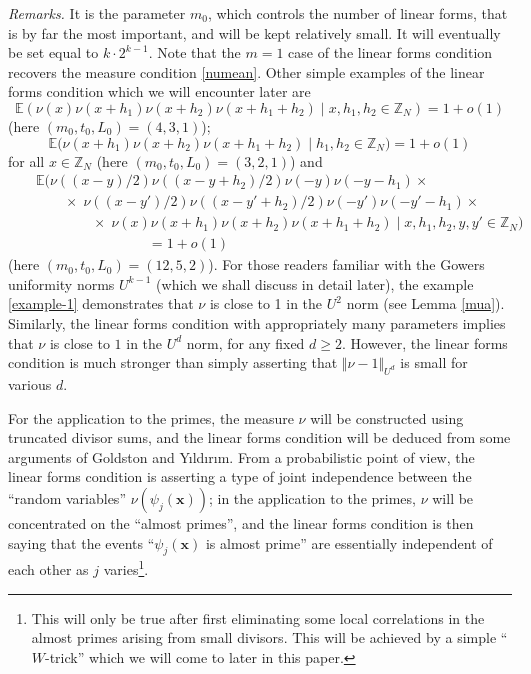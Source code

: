 \documentclass[12pt,a4paper,reqno]{amsart}
\numberwithin{equation}{section}
\theoremstyle{plain}
\theoremstyle{definition}
\renewcommand{\geq}{\geqslant}
\def\Z{{\mathbb Z}}
\def\E{{\mathbb E}}
\def\vs{\vspace{11pt}}
\def\ni{\noindent}
\begin{document}
\ni\textit{Remarks.} It is the parameter $m_0$, which controls the number of linear forms, that is by far the most important, and will be kept relatively small. It will eventually be set equal to $k \cdot 2^{k-1}$.  Note that the $m=1$ case of the linear forms condition recovers the measure condition \eqref{numean}.  Other simple examples of the linear forms condition which we will encounter later are
\begin{equation}\label{example-1}
\E( \nu(x) \nu(x+h_1) \nu(x+h_2) \nu(x+h_1+h_2) \; | \; x,h_1,h_2 \in \Z_N) = 1 + o(1) \end{equation}
(here $(m_0, t_0, L_0) = (4,3,1)$);
\begin{equation}\label{example-2} 
\E \big( \nu(x + h_1) \nu(x + h_2) \nu(x + h_1 + h_2) \; | \; h_1 , h_2 \in \Z_N \big) = 1 + o(1)
\end{equation}
for all $x \in \Z_N$ (here $(m_0,t_0, L_0) = (3,2,1)$) and
\begin{eqnarray}\nonumber& & 
\E\bigg( \nu((x-y)/2) \nu((x-y+h_2)/2) \nu(-y) \nu(-y-h_1) \times \\ & & \nonumber
\qquad \times \; \nu((x-y')/2) \nu((x-y'+h_2)/2)  \nu(-y') \nu(-y'-h_1) \times \\ & &
\qquad \qquad \times \; \nu(x) \nu(x+h_1) \nu(x+h_2) \nu(x+h_1+h_2) \; 
\bigg| \; x,h_1,h_2,y,y' \in \Z_N\bigg) \nonumber \\ & & \qquad \qquad \qquad \qquad = 1 + o(1)\label{example-3}
\end{eqnarray} (here $(m_0, t_0, L_0) = (12,5,2)$).
For those readers familiar with the Gowers uniformity norms $U^{k-1}$ 
(which we shall discuss in detail later), the example \eqref{example-1} demonstrates that $\nu$ is close to 1 in the $U^2$ norm (see Lemma \ref{mua}). Similarly, the linear forms condition with appropriately many parameters implies that $\nu$ is close to $1$ in the $U^d$ norm, for any fixed $d \geq 2$. However, the linear forms condition is much stronger than simply asserting that $\Vert \nu - 1 \Vert_{U^d}$ is small for various $d$.\vs

\ni For the application to the primes, the measure $\nu$ will be constructed using truncated divisor sums, and the linear forms condition will be deduced from some arguments of Goldston and Y{\i}ld{\i}r{\i}m.  From a probabilistic point of view, the linear
forms condition is asserting a type of joint independence between the ``random variables'' $\nu(\psi_j(\mathbf{x}))$; in the application to the primes,
$\nu$ will be concentrated on the ``almost primes'', and the linear forms condition is then saying that the events ``$\psi_j(\mathbf{x})$ is almost prime'' are essentially independent of each other as $j$ varies\footnote{This will only be true after first eliminating some local correlations in the almost primes arising from small divisors.  This will be achieved by a simple ``$W$-trick'' which we will come to later in this paper.}.  
\end{document}
